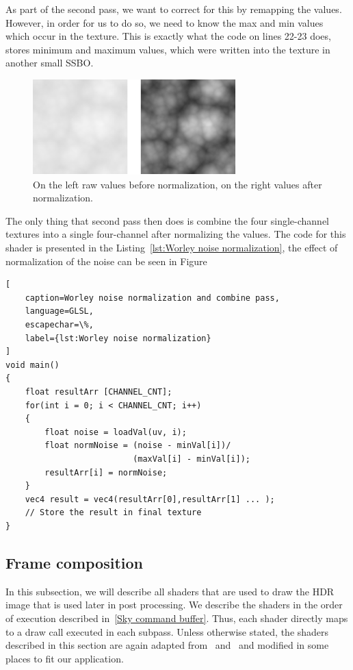 \documentclass{ctuthesis}
\begin{document}
As part of the second pass, we want to correct for this by remapping the values. However, in order for
us to do so, we need to know the max and min values which occur in the texture. This is exactly what the
code on lines 22-23 does, stores minimum and maximum values, which were written into the texture 
in another small SSBO.

\begin{figure}[h!]
        \includegraphics[width=0.7\textwidth]{media/Worley_raw_normalized.png}
        \caption[Worley normalization]{On the left raw values before normalization, on the right values after normalization.}
        \label{fig:worley normalization effects}
\end{figure}

The only thing that second pass then does is combine the four single-channel textures into a single
four-channel after normalizing the values. The code for this shader is presented in the 
Listing~\ref{lst:Worley noise normalization}, the effect of normalization of the noise can 
be seen in Figure

\begin{lstlisting}[ 
    caption=Worley noise normalization and combine pass,
    language=GLSL,
    escapechar=\%,
    label={lst:Worley noise normalization}
]
void main()
{
    float resultArr [CHANNEL_CNT];
    for(int i = 0; i < CHANNEL_CNT; i++)
    {
        float noise = loadVal(uv, i);
        float normNoise = (noise - minVal[i])/
                          (maxVal[i] - minVal[i]);
        resultArr[i] = normNoise;
    }
    vec4 result = vec4(resultArr[0],resultArr[1] ... ); 
    // Store the result in final texture
}
\end{lstlisting}

\subsection{Frame composition}
In this subsection, we will describe all shaders that are used to draw the HDR image that is used later
in post processing. We describe the shaders in the order of execution described in~\ref{Sky command buffer}.
Thus, each shader directly maps to a draw call executed in each subpass. Unless otherwise stated, the shaders described
in this section are again adapted from~\cite{hillaire_2020} and~\cite{lague_2019} and modified in some
places to fit our application.
\end{document}
